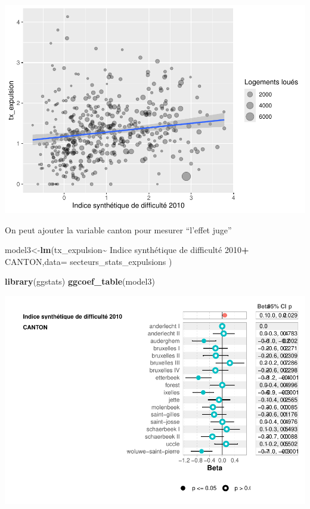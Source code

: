 \documentclass[
]{book}
\newenvironment{Shaded}{\begin{snugshade}}{\end{snugshade}}
\newcommand{\AttributeTok}[1]{\textcolor[rgb]{0.13,0.29,0.53}{#1}}
\newcommand{\FunctionTok}[1]{\textcolor[rgb]{0.13,0.29,0.53}{\textbf{#1}}}
\newcommand{\NormalTok}[1]{#1}
\newcommand{\OtherTok}[1]{\textcolor[rgb]{0.56,0.35,0.01}{#1}}
\newcommand{\SpecialCharTok}[1]{\textcolor[rgb]{0.81,0.36,0.00}{\textbf{#1}}}
\newcommand{\StringTok}[1]{\textcolor[rgb]{0.31,0.60,0.02}{#1}}
\begin{document}
\includegraphics{manuel_geo_quanti_files/figure-latex/unnamed-chunk-40-1.pdf}

On peut ajouter la variable canton pour mesurer ``l'effet juge''

\begin{Shaded}
\begin{Highlighting}[]
\NormalTok{model3}\OtherTok{\textless{}{-}}\FunctionTok{lm}\NormalTok{(tx\_expulsion}\SpecialCharTok{\textasciitilde{}} \StringTok{\textasciigrave{}}\AttributeTok{Indice synthétique de difficulté 2010}\StringTok{\textasciigrave{}}\SpecialCharTok{+}\NormalTok{ CANTON,}\AttributeTok{data=}\NormalTok{ secteurs\_stats\_expulsions )}

\FunctionTok{library}\NormalTok{(ggstats)}
\FunctionTok{ggcoef\_table}\NormalTok{(model3)}
\end{Highlighting}
\end{Shaded}

\includegraphics{manuel_geo_quanti_files/figure-latex/unnamed-chunk-41-1.pdf}
\end{document}
